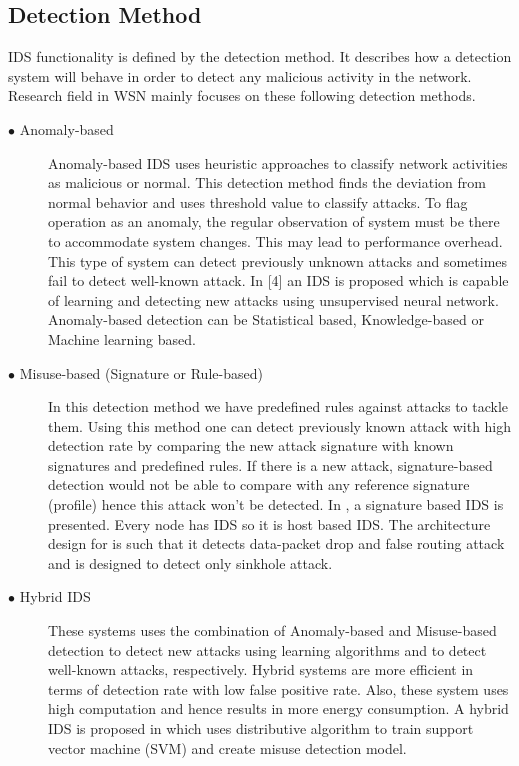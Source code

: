 \subsection{Detection Method}
IDS functionality is defined by the detection method. It describes how a detection system will behave in order to detect any malicious activity in the network. Research field in WSN mainly focuses on these following detection methods.
\begin{description}
  \item[$\bullet$ Anomaly-based] Anomaly-based IDS uses heuristic approaches to classify network activities as malicious or normal. This detection method finds the deviation from normal behavior and uses threshold value to classify attacks. To flag operation as an anomaly, the regular observation of system must be there to accommodate system changes. This may lead to performance overhead. This type of system can detect previously unknown attacks and sometimes fail to detect well-known attack. In [4] an IDS is proposed which is capable of learning and detecting new attacks using unsupervised neural network. Anomaly-based detection can be Statistical based, Knowledge-based or Machine learning based.
  \item[$\bullet$ Misuse-based (Signature or Rule-based)] In this detection method we have predefined rules against attacks to tackle them. Using this method one can detect previously known attack with high detection rate by comparing the new attack signature with known signatures and predefined rules. If there is a new attack, signature-based detection would not be able to compare with any reference signature (profile) hence this attack won’t be detected. In \cite{ioannis2007towards, krontiris2007intrusion}, a signature based IDS is presented. Every node has IDS so it is host based IDS. The architecture design for \cite{ioannis2007towards} is such that it detects data-packet drop and false routing attack and \cite{krontiris2007intrusion} is designed to detect only sinkhole attack.
  \item[$\bullet$ Hybrid IDS] These systems uses the combination of Anomaly-based and Misuse-based detection to detect new attacks using learning algorithms and  to detect well-known attacks, respectively. Hybrid systems are more efficient in terms of detection rate with low false positive rate. Also, these system uses high computation and hence results in more energy consumption. A hybrid IDS is proposed in \cite{li2008intruder} which uses distributive algorithm to train support vector machine (SVM) and create misuse detection model.
\end{description}
